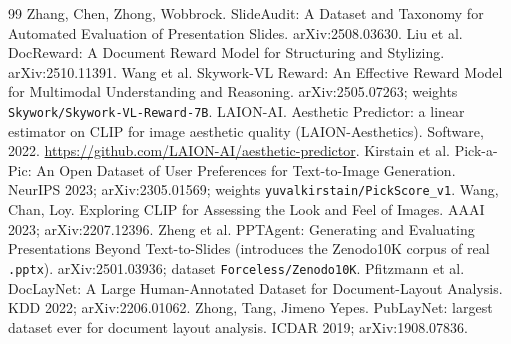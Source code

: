 \documentclass[10pt]{article}
\begin{document}
\begin{thebibliography}{99}
 Zhang, Chen, Zhong, Wobbrock. SlideAudit: A Dataset and Taxonomy for Automated Evaluation of Presentation Slides. arXiv:2508.03630.
 Liu et al. DocReward: A Document Reward Model for Structuring and Stylizing. arXiv:2510.11391.
 Wang et al. Skywork-VL Reward: An Effective Reward Model for Multimodal Understanding and Reasoning. arXiv:2505.07263; weights \texttt{Skywork/Skywork-VL-Reward-7B}.
 LAION-AI. Aesthetic Predictor: a linear estimator on CLIP for image aesthetic quality (LAION-Aesthetics). Software, 2022. \url{https://github.com/LAION-AI/aesthetic-predictor}.
 Kirstain et al. Pick-a-Pic: An Open Dataset of User Preferences for Text-to-Image Generation. NeurIPS 2023; arXiv:2305.01569; weights \texttt{yuvalkirstain/PickScore\_v1}.
 Wang, Chan, Loy. Exploring CLIP for Assessing the Look and Feel of Images. AAAI 2023; arXiv:2207.12396.
 Zheng et al. PPTAgent: Generating and Evaluating Presentations Beyond Text-to-Slides (introduces the Zenodo10K corpus of real \texttt{.pptx}). arXiv:2501.03936; dataset \texttt{Forceless/Zenodo10K}.
 Pfitzmann et al. DocLayNet: A Large Human-Annotated Dataset for Document-Layout Analysis. KDD 2022; arXiv:2206.01062.
 Zhong, Tang, Jimeno Yepes. PubLayNet: largest dataset ever for document layout analysis. ICDAR 2019; arXiv:1908.07836.
\end{thebibliography}
\end{document}
